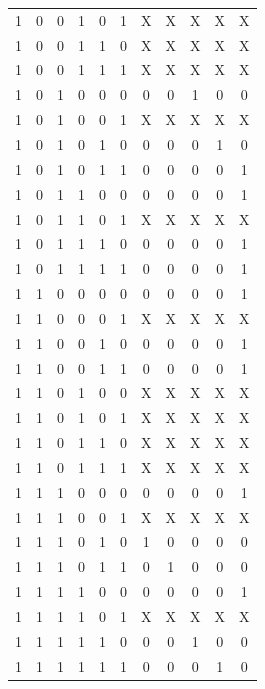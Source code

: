 \documentclass{article}
\begin{document}
\begin{center}
\begin{tabular}{c|c|c|c|c|c|c|c|c|c|c}
        1  &  0  &  0  &  1  &  0  &  1  &  X  &  X  &  X  &  X  &  X \\
        1  &  0  &  0  &  1  &  1  &  0  &  X  &  X  &  X  &  X  &  X \\
        1  &  0  &  0  &  1  &  1  &  1  &  X  &  X  &  X  &  X  &  X \\
        1  &  0  &  1  &  0  &  0  &  0  &  0  &  0  &  1  &  0  &  0 \\
        1  &  0  &  1  &  0  &  0  &  1  &  X  &  X  &  X  &  X  &  X \\
        1  &  0  &  1  &  0  &  1  &  0  &  0  &  0  &  0  &  1  &  0 \\
        1  &  0  &  1  &  0  &  1  &  1  &  0  &  0  &  0  &  0  &  1 \\
        1  &  0  &  1  &  1  &  0  &  0  &  0  &  0  &  0  &  0  &  1 \\
        1  &  0  &  1  &  1  &  0  &  1  &  X  &  X  &  X  &  X  &  X \\
        1  &  0  &  1  &  1  &  1  &  0  &  0  &  0  &  0  &  0  &  1 \\
        1  &  0  &  1  &  1  &  1  &  1  &  0  &  0  &  0  &  0  &  1 \\
        1  &  1  &  0  &  0  &  0  &  0  &  0  &  0  &  0  &  0  &  1 \\
        1  &  1  &  0  &  0  &  0  &  1  &  X  &  X  &  X  &  X  &  X \\
        1  &  1  &  0  &  0  &  1  &  0  &  0  &  0  &  0  &  0  &  1 \\
        1  &  1  &  0  &  0  &  1  &  1  &  0  &  0  &  0  &  0  &  1 \\
        1  &  1  &  0  &  1  &  0  &  0  &  X  &  X  &  X  &  X  &  X \\
        1  &  1  &  0  &  1  &  0  &  1  &  X  &  X  &  X  &  X  &  X \\
        1  &  1  &  0  &  1  &  1  &  0  &  X  &  X  &  X  &  X  &  X \\
        1  &  1  &  0  &  1  &  1  &  1  &  X  &  X  &  X  &  X  &  X \\
        1  &  1  &  1  &  0  &  0  &  0  &  0  &  0  &  0  &  0  &  1 \\
        1  &  1  &  1  &  0  &  0  &  1  &  X  &  X  &  X  &  X  &  X \\
        1  &  1  &  1  &  0  &  1  &  0  &  1  &  0  &  0  &  0  &  0 \\
        1  &  1  &  1  &  0  &  1  &  1  &  0  &  1  &  0  &  0  &  0 \\
        1  &  1  &  1  &  1  &  0  &  0  &  0  &  0  &  0  &  0  &  1 \\
        1  &  1  &  1  &  1  &  0  &  1  &  X  &  X  &  X  &  X  &  X \\
        1  &  1  &  1  &  1  &  1  &  0  &  0  &  0  &  1  &  0  &  0 \\
        1  &  1  &  1  &  1  &  1  &  1  &  0  &  0  &  0  &  1  &  0    
    \end{tabular}
\end{center}
\end{document}
